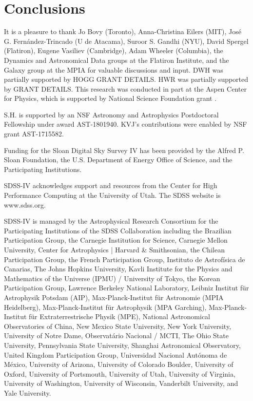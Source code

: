 \documentclass[modern]{aastex63}
\begin{document}

\section{Conclusions}
\label{sec:conclusions}



\acknowledgments
It is a pleasure to thank
  Jo Bovy (Toronto),
  Anna-Christina Eilers (MIT),
  Jos\'e G. Fern\'andez-Trincado (U de Atacama),
  Suroor S. Gandhi (NYU),
  David Spergel (Flatiron),
  Eugene Vasiliev (Cambridge),
  Adam Wheeler (Columbia),
  the Dynamics and Astronomical Data groups at the Flatiron Institute,
  and the Galaxy group at the MPIA
for valuable discussions and input.
DWH was partially supported by HOGG GRANT DETAILS.
HWR was partially supported by GRANT DETAILS.
This research was conducted in part at the Aspen Center for Physics,
which is supported by National Science Foundation grant .

S.H. is supported by an NSF Astronomy and Astrophysics Postdoctoral Fellowship
under award AST-1801940.
KVJ's contributions were enabled by NSF grant AST-1715582.

Funding for the Sloan Digital Sky
Survey IV has been provided by the
Alfred P. Sloan Foundation, the U.S.
Department of Energy Office of
Science, and the Participating
Institutions.

SDSS-IV acknowledges support and
resources from the Center for High
Performance Computing  at the
University of Utah. The SDSS
website is www.sdss.org.

SDSS-IV is managed by the
Astrophysical Research Consortium
for the Participating Institutions
of the SDSS Collaboration including
the Brazilian Participation Group,
the Carnegie Institution for Science,
Carnegie Mellon University, Center for
Astrophysics | Harvard \&
Smithsonian, the Chilean Participation
Group, the French Participation Group,
Instituto de Astrof\'isica de
Canarias, The Johns Hopkins
University, Kavli Institute for the
Physics and Mathematics of the
Universe (IPMU) / University of
Tokyo, the Korean Participation Group,
Lawrence Berkeley National Laboratory,
Leibniz Institut f\"ur Astrophysik
Potsdam (AIP),  Max-Planck-Institut
f\"ur Astronomie (MPIA Heidelberg),
Max-Planck-Institut f\"ur
Astrophysik (MPA Garching),
Max-Planck-Institut f\"ur
Extraterrestrische Physik (MPE),
National Astronomical Observatories of
China, New Mexico State University,
New York University, University of
Notre Dame, Observat\'ario
Nacional / MCTI, The Ohio State
University, Pennsylvania State
University, Shanghai
Astronomical Observatory, United
Kingdom Participation Group,
Universidad Nacional Aut\'onoma
de M\'exico, University of Arizona,
University of Colorado Boulder,
University of Oxford, University of
Portsmouth, University of Utah,
University of Virginia, University
of Washington, University of
Wisconsin, Vanderbilt University,
and Yale University.
\end{document}
